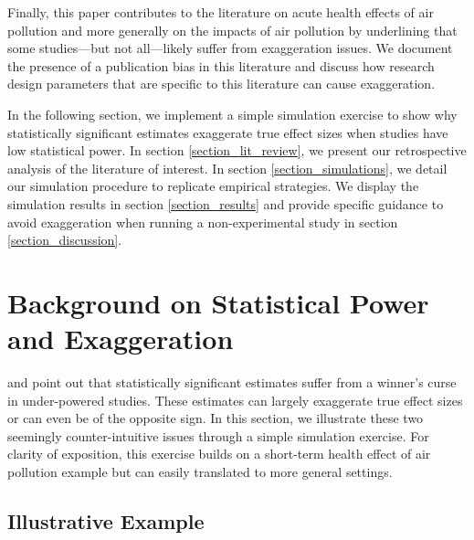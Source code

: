 \documentclass[12pt]{article}
\begin{document}
    Finally, this paper contributes to the literature on acute health effects of air pollution and more generally on the impacts of air pollution by underlining that some studies---but not all---likely suffer from exaggeration issues. We document the presence of a publication bias in this literature and discuss how research design parameters that are specific to this literature can cause exaggeration. 

    In the following section, we implement a simple simulation exercise to show why statistically significant estimates exaggerate true effect sizes when studies have low statistical power. In section \ref{section_lit_review}, we present our retrospective analysis of the literature of interest. In section \ref{section_simulations}, we detail our simulation procedure to replicate empirical strategies. We display the simulation results in section \ref{section_results} and provide specific guidance to avoid exaggeration when running a non-experimental study in section \ref{section_discussion}.
    




\section{Background on Statistical Power and Exaggeration}\label{section_mad_scientist}

    \cite{gelmanType2000} and \cite{gelman_beyond_2014} point out that statistically significant estimates suffer from a winner's curse in under-powered studies. These estimates can largely exaggerate true effect sizes or can even be of the opposite sign. In this section, we illustrate these two seemingly counter-intuitive issues through a simple simulation exercise. For clarity of exposition, this exercise builds on a short-term health effect of air pollution example but can easily translated to more general settings.

    \subsection{Illustrative Example}
\end{document}
